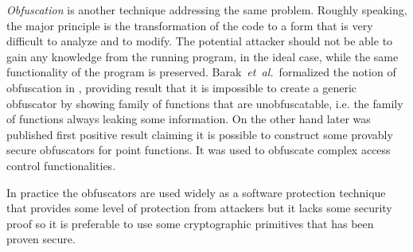 \documentclass[11pt,oneside,final]{fithesis2}
\newcommand{\eal}{\emph{et~al.}}
\begin{document}
    \emph{Obfuscation} is another technique addressing the same problem. Roughly speaking, the major principle is the transformation of the code to a form that is very difficult 
    to analyze and to modify. The potential attacker should not be able to gain any knowledge from the running program, in the ideal case, while the same functionality 
    of the program is preserved. Barak~\eal~formalized the notion of obfuscation in \citep{Barak:2012:POP:2160158.2160159}, providing result that it is impossible 
    to create a generic obfuscator by showing family of functions that are unobfuscatable, i.e. the family of functions always leaking some information. On the other hand
    later was published first positive result \citep{Lynn04positiveresults} claiming it is possible to construct some provably secure obfuscators for point functions.
    It was used to obfuscate complex access control functionalities.
    
    In practice the obfuscators are used widely as a software protection technique that provides some level of protection from attackers but it lacks some 
    security proof so it is preferable to use some cryptographic primitives that has been proven secure. 
    
\end{document}
